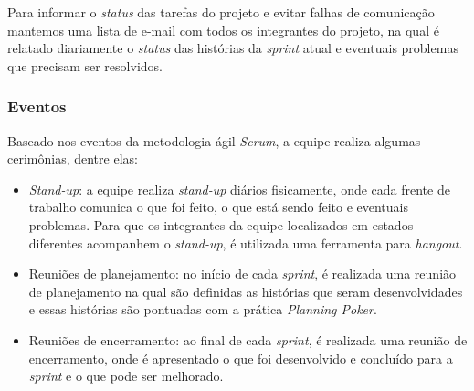 Para informar o \textit{status} das tarefas do projeto e evitar falhas de comunicação mantemos uma lista de e-mail com todos os integrantes do projeto, na qual é relatado diariamente o \textit{status} das histórias da \textit{sprint} atual e eventuais problemas que precisam ser resolvidos. 


\subsubsection{Eventos}

Baseado nos eventos da metodologia ágil \textit{Scrum}, a equipe realiza algumas cerimônias, dentre elas:

\begin{itemize}
 \item \textit{Stand-up}: a equipe realiza \textit{stand-up} diários fisicamente, onde cada frente de trabalho comunica o que foi feito, o que está sendo feito e eventuais problemas. Para que os integrantes da equipe localizados em estados diferentes acompanhem o \textit{stand-up}, é utilizada uma ferramenta para \textit{hangout}.
 \item Reuniões de planejamento: no início de cada \textit{sprint}, é realizada uma reunião de planejamento na qual são definidas as histórias que seram desenvolvidades e essas histórias são pontuadas com a prática \textit{Planning Poker}.
 \item Reuniões de encerramento: ao final de cada \textit{sprint}, é realizada uma reunião de encerramento, onde é apresentado o que foi desenvolvido e concluído para a \textit{sprint} e o que pode ser melhorado.
\end{itemize}


